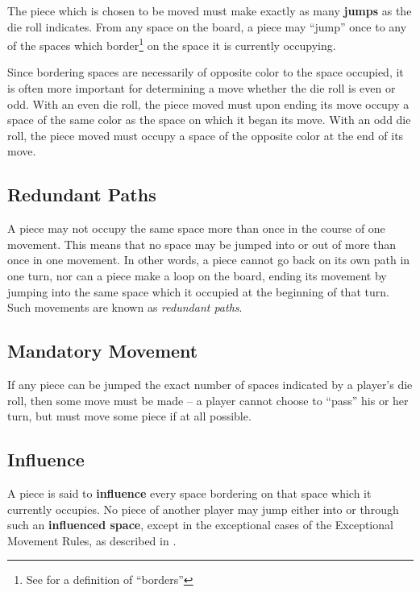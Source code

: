 The piece which is chosen to be moved must make exactly as many
{\bf jumps} as the die roll indicates.  From any space on the board,
a piece may ``jump'' once to any of the spaces which
border\footnote{See  for a definition of ``borders''}
on the space it is currently occupying.

Since bordering spaces are necessarily of opposite color
to the space occupied, it is often more important for determining
a move whether the die roll is even or odd.  With an even die roll,
the piece moved must upon ending its move occupy a space of the
same color as the space on which it began its move.  With an odd
die roll, the piece moved must occupy a space of the opposite color
at the end of its move.

\subsection{Redundant Paths}\label{redundant}
A piece may not occupy the same space more than once in the course
of one movement.  This means that no space may be jumped into or out
of more than once in one movement.  In other words, a piece cannot
go back on its own path in one turn, nor can a piece make a loop on
the board, ending its movement by jumping into the same space
which it occupied at the beginning of that turn.  Such
movements are known as {\sl redundant paths}.

\subsection{Mandatory Movement}\label{mandatory}
If any piece can be jumped the exact number of spaces indicated by a
player's die roll, then some move must be made -- a player cannot
choose to ``pass'' his or her turn, but must move some piece if at
all possible.



\subsection{Influence}\label{influence}

A piece is said to {\bf influence} every space bordering on that space which
it currently occupies.  No piece of another player may jump either into or
through such an {\bf influenced space},
except in the exceptional cases of 
the Exceptional Movement Rules, as described in
.

